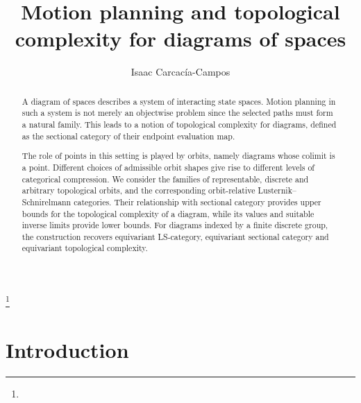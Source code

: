 \documentclass[12pt]{amsart}
\theoremstyle{definition}
\theoremstyle{remark}
\numberwithin{figure}{section}%
\begin{document}
\title[Motion planning for diagrams of spaces]{Motion planning and topological complexity for diagrams of spaces}
\thanks{}


\author[Isaac Carcacía-Campos]{%
	Isaac Carcacía-Campos%
}


		
 \address{%
           	Isaac Carcacía-Campos
            \\
              Departamento de Matem\'aticas, Universidade de Santiago de Compostela, 15782-SPAIN}





\begin{abstract} 
A diagram of spaces describes a system of interacting state spaces. Motion planning in such a system is not merely an objectwise problem since the selected paths must form a natural family. This leads to a notion of topological complexity for diagrams, defined as the sectional category of their endpoint evaluation map.

The role of points in this setting is played by orbits, namely diagrams whose colimit is a point. Different choices of admissible orbit shapes give rise to different levels of categorical compression. We consider the families of representable, discrete and arbitrary topological orbits, and the corresponding orbit-relative Lusternik--Schnirelmann categories. Their relationship with sectional category provides upper bounds for the topological complexity of a diagram, while its values and suitable inverse limits provide lower bounds. For diagrams indexed by a finite discrete group, the construction recovers equivariant LS-category, equivariant sectional category and equivariant topological complexity.
\end{abstract}


\maketitle


\section*{Introduction}
\end{document}
